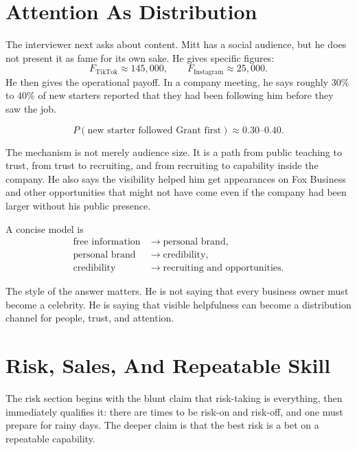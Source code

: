 \section{Attention As Distribution}

The interviewer next asks about content. Mitt has a social audience, but he does not present it as fame for its own sake. He gives specific figures:
\begin{equation}
F_{\text{TikTok}} \approx 145{,}000,
\qquad
F_{\text{Instagram}} \approx 25{,}000.
\end{equation}
He then gives the operational payoff. In a company meeting, he says roughly \(30\%\) to \(40\%\) of new starters reported that they had been following him before they saw the job.

\begin{equation}
P(\text{new starter followed Grant first})
\approx 0.30\text{--}0.40.
\end{equation}

The mechanism is not merely audience size. It is a path from public teaching to trust, from trust to recruiting, and from recruiting to capability inside the company. He also says the visibility helped him get appearances on Fox Business and other opportunities that might not have come even if the company had been larger without his public presence.

A concise model is
\begin{align}
\text{free information} &\longrightarrow \text{personal brand},\\
\text{personal brand} &\longrightarrow \text{credibility},\\
\text{credibility} &\longrightarrow \text{recruiting and opportunities}.
\end{align}

The style of the answer matters. He is not saying that every business owner must become a celebrity. He is saying that visible helpfulness can become a distribution channel for people, trust, and attention.

\section{Risk, Sales, And Repeatable Skill}

The risk section begins with the blunt claim that risk-taking is everything, then immediately qualifies it: there are times to be risk-on and risk-off, and one must prepare for rainy days. The deeper claim is that the best risk is a bet on a repeatable capability.

